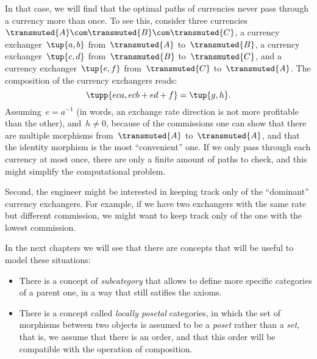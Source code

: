 In that case, we will find that the optimal paths of currencies never pass through a currency more than once.
To see this, consider three currencies~$\transmuted{A}\com\transmuted{B}\com\transmuted{C}$, a currency exchanger~$\tup{a,b}$ from~$\transmuted{A}$ to~$\transmuted{B}$, a currency exchanger~$\tup{c,d}$ from~$\transmuted{B}$ to~$\transmuted{C}$, and a currency exchanger~$\tup{e,f}$ from~$\transmuted{C}$ to~$\transmuted{A}$.
The composition of the currency exchangers reads:
\begin{equation}
    \tupp{eca, ecb+ed+f}=\tup{g,h}.
\end{equation}
Assuming~$e=a^{-1}$ (in words, an exchange rate direction is not more profitable than the other), and~$h\neq 0$, because of the commissions one can show that there are multiple morphisms from~$\transmuted{A}$ to~$\transmuted{A}$, and that the identity morphism is the most ``convenient'' one.
If we only pass through each currency at most once, there are only a finite amount of paths to check, and this might simplify the computational problem.

Second, the engineer might be interested in keeping track only of the ``dominant'' currency exchangers.
For example, if we have two exchangers with the same rate but different commission, we might want to keep track only of the one with the lowest commission.

In the next chapters we will see that there are concepts that will be useful to model these situations:
\begin{itemize}
    \item There is a concept of \emph{subcategory} that allows to define more specific categories of a parent one, in a way that still satifies the axioms.
    \item There is a concept called \emph{locally posetal} categories, in which the set of morphisms between two objects is assumed to be a \emph{poset} rather than a \emph{set}, that is, we assume that there is an order, and that this order will be compatible with the operation of composition.
\end{itemize}
